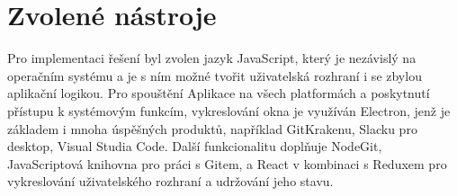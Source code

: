 \section{Zvolené nástroje}

Pro implementaci řešení byl zvolen jazyk JavaScript, který je nezávislý na operačním systému a je s ním možné tvořit uživatelská rozhraní i se zbylou aplikační logikou. Pro spouštění Aplikace na všech platformách a poskytnutí přístupu k systémovým funkcím, vykreslování okna je využíván Electron, jenž je základem i mnoha úspěšných produktů, například GitKrakenu, Slacku pro desktop, Visual Studia Code. Další funkcionalitu doplňuje NodeGit, JavaScriptová knihovna pro práci s Gitem, a React v kombinaci s Reduxem pro vykreslování uživatelského rozhraní a udržování jeho stavu.